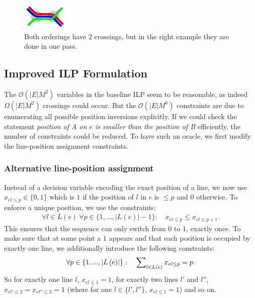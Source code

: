\documentclass[format=acmsmall, review=false, screen=true]{acmart}
\begin{document}
\begin{figure}[t]
\begin{minipage}{.48\textwidth}
  \includegraphics[trim={2.25 2.2 2.25 2.2},clip,width=.45\textwidth]{render_examples/splitting_example2.pdf}
  \caption{Both orderings have 2 crossings, but in the right example they are done in one pass.}
  \label{FIG:linesplitting2}
\end{minipage}
\end{figure}

%
\subsection{Improved ILP Formulation}\label{SEC:improved}
%
The $\mathcal{O}(|E|M^{2})$ variables in the baseline ILP seem to be reasonable, as indeed $\Omega(|E|M^{2})$ crossings could occur. But the $\mathcal{O}(|E|M^{6})$ constraints are due to enumerating all possible position inversions explicitly. If we could check the statement \emph{position of A on $e$ is smaller than the position of B} efficiently, the number of constraints could be reduced. To have such an oracle, we first modify the line-position assignment constraints.

\subsubsection{Alternative line-position assignment}
Instead of a decision variable encoding the exact position of a line, we now use $x_{el\leq p} \in \{0,1\}$ which is $1$ if the position of $l$ in $e$ is $\leq p$ and $0$ otherwise. To enforce a unique position, we use the constraints:
\begin{align}
	\forall l \in L(e)~ \forall p \in \{1, ..., \left|L\left(e\right)\right|-1\}: \quad x_{el\leq p} \leq x_{el\leq p+1}. \label{EQ:up_constr}
\end{align}
This ensures that the sequence can only switch from $0$ to $1$, exactly once. To make sure that at some point a $1$ appears and that each position is occupied by exactly one line, we additionally introduce the following constraints:
\begin{align}
	\forall p \in \{1, ..., \left|L\left(e\right)\right|\}: \quad  \sum\nolimits_{l \in L(e)} x_{el\leq p} = p. \label{EQ:01_constr}
\end{align}
So for exactly one line $l$, $x_{el\leq 1} = 1$, for exactly two lines $l'$ and $l''$, $x_{el'\leq 2} = x_{el''\leq 2} = 1$ (where for one $l \in \{l',l''\}$, $x_{el\leq 1} =1$) and so on.
\end{document}
